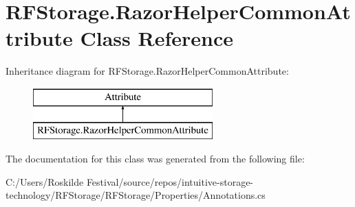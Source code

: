 \section{R\+F\+Storage.\+Razor\+Helper\+Common\+Attribute Class Reference}
\label{class_r_f_storage_1_1_razor_helper_common_attribute}
Inheritance diagram for R\+F\+Storage.\+Razor\+Helper\+Common\+Attribute\+:\begin{figure}[H]
\begin{center}
\leavevmode
\includegraphics[height=2.000000cm]{class_r_f_storage_1_1_razor_helper_common_attribute}
\end{center}
\end{figure}


The documentation for this class was generated from the following file\+:\begin{DoxyCompactItemize}
\item 
C\+:/\+Users/\+Roskilde Festival/source/repos/intuitive-\/storage-\/technology/\+R\+F\+Storage/\+R\+F\+Storage/\+Properties/Annotations.\+cs\end{DoxyCompactItemize}
